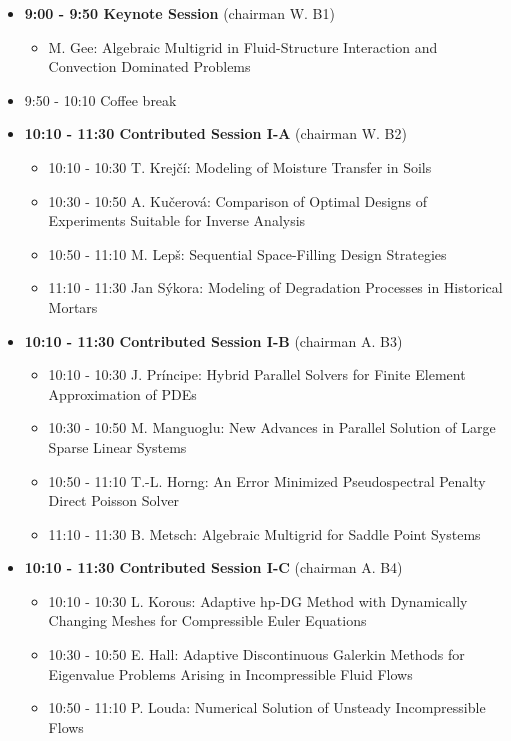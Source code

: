 \documentclass[10pt, A4]{article}%
\begin{document}
\begin{itemize}    
  \item {\bf 9:00 - 9:50 Keynote Session} (chairman W. B1) 
  \begin{itemize}
    \item M. Gee: Algebraic Multigrid in Fluid-Structure Interaction and Convection Dominated Problems
  \end{itemize}
  \item 9:50 - 10:10 Coffee break
  \item {\bf 10:10 - 11:30 Contributed Session I-A} (chairman W. B2) 
  \begin{itemize}
    \item 10:10 - 10:30 T. Krej\v{c}\'{i}: Modeling of Moisture Transfer in Soils
    \item 10:30 - 10:50 A. Ku\v{c}erov\'{a}: Comparison of Optimal Designs of Experiments Suitable for Inverse Analysis
    \item 10:50 - 11:10 M. Lep\v{s}: Sequential Space-Filling Design Strategies
    \item 11:10 - 11:30 Jan S\'{y}kora: Modeling of Degradation Processes in Historical Mortars
  \end{itemize}
  \item {\bf 10:10 - 11:30 Contributed Session I-B} (chairman A. B3) 
  \begin{itemize}
    \item 10:10 - 10:30 J. Pr\'{i}ncipe: Hybrid Parallel Solvers for Finite Element Approximation of PDEs
    \item 10:30 - 10:50 M. Manguoglu: New Advances in Parallel Solution of Large Sparse Linear Systems
    \item 10:50 - 11:10 T.-L. Horng: An Error Minimized Pseudospectral Penalty Direct Poisson Solver
    \item 11:10 - 11:30 B. Metsch: Algebraic Multigrid for Saddle Point Systems
  \end{itemize}
  \item {\bf 10:10 - 11:30 Contributed Session I-C} (chairman A. B4) 
  \begin{itemize}
    \item 10:10 - 10:30 L. Korous: Adaptive hp-DG Method with Dynamically Changing Meshes for Compressible Euler Equations
    \item 10:30 - 10:50 E. Hall: Adaptive Discontinuous Galerkin Methods for Eigenvalue Problems Arising in Incompressible Fluid Flows
    \item 10:50 - 11:10 P. Louda: Numerical Solution of Unsteady Incompressible Flows

\end{itemize}
\end{itemize}
\end{document}
